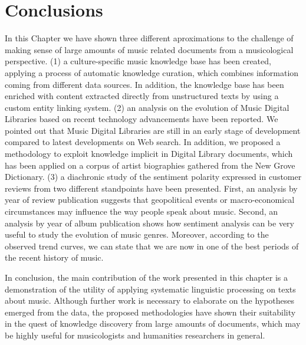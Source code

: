 \section{Conclusions}

In this Chapter we have shown three different aproximations to the challenge of making sense of large amounts of music related documents from a musicological perspective. (1) a culture-specific music knowledge base has been created, applying a process of automatic knowledge curation, which combines information coming from different data sources. In addition, the knowledge base has been enriched with content extracted directly from unstructured texts by using a custom entity linking system. (2) an analysis on the evolution of Music Digital Libraries based on recent technology advancements have been reported. We pointed out that Music Digital Libraries are still in an early stage of development compared to latest developments on Web search. In addition, we proposed a methodology to exploit knowledge implicit in Digital Library documents, which has been applied on a corpus of artist biographies gathered from the New Grove Dictionary. (3) a diachronic study of the sentiment polarity expressed in customer reviews from two different standpoints have been presented. First, an analysis by year of review publication suggests that geopolitical events or macro-economical circumstances may influence the way people speak about music. Second, an analysis by year of album publication shows how sentiment analysis can be very useful to study the evolution of music genres. Moreover, according to the observed trend curves, we can state that we are now in one of the best periods of the recent history of music. 

In conclusion, the main contribution of the work presented in this chapter is a demonstration of the utility of applying systematic linguistic processing on texts about music. Although further work is necessary to elaborate on the hypotheses emerged from the data, the proposed methodologies have shown their suitability in the quest of knowledge discovery from large amounts of documents, which may be highly useful for musicologists and humanities researchers in general.
